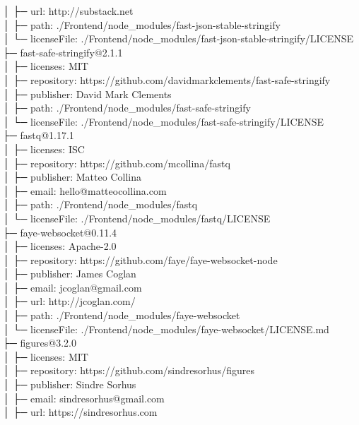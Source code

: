 \documentclass[
    paper=a4,
    twoside=false,
    parskip=half,
    listof=entryprefix,
    listof=totoc,
    index=totoc,
    bibliography=totoc,
    headsepline,
]{scrbook}
\begin{document}
    │  ├─ url: http://substack.net\\
    │  ├─ path: ./Frontend/node\_modules/fast-json-stable-stringify\\
    │  └─ licenseFile: ./Frontend/node\_modules/fast-json-stable-stringify/LICENSE\\
    ├─ fast-safe-stringify@2.1.1\\
    │  ├─ licenses: MIT\\
    │  ├─ repository: https://github.com/davidmarkclements/fast-safe-stringify\\
    │  ├─ publisher: David Mark Clements\\
    │  ├─ path: ./Frontend/node\_modules/fast-safe-stringify\\
    │  └─ licenseFile: ./Frontend/node\_modules/fast-safe-stringify/LICENSE\\
    ├─ fastq@1.17.1\\
    │  ├─ licenses: ISC\\
    │  ├─ repository: https://github.com/mcollina/fastq\\
    │  ├─ publisher: Matteo Collina\\
    │  ├─ email: hello@matteocollina.com\\
    │  ├─ path: ./Frontend/node\_modules/fastq\\
    │  └─ licenseFile: ./Frontend/node\_modules/fastq/LICENSE\\
    ├─ faye-websocket@0.11.4\\
    │  ├─ licenses: Apache-2.0\\
    │  ├─ repository: https://github.com/faye/faye-websocket-node\\
    │  ├─ publisher: James Coglan\\
    │  ├─ email: jcoglan@gmail.com\\
    │  ├─ url: http://jcoglan.com/\\
    │  ├─ path: ./Frontend/node\_modules/faye-websocket\\
    │  └─ licenseFile: ./Frontend/node\_modules/faye-websocket/LICENSE.md\\
    ├─ figures@3.2.0\\
    │  ├─ licenses: MIT\\
    │  ├─ repository: https://github.com/sindresorhus/figures\\
    │  ├─ publisher: Sindre Sorhus\\
    │  ├─ email: sindresorhus@gmail.com\\
    │  ├─ url: https://sindresorhus.com\\
\end{document}
